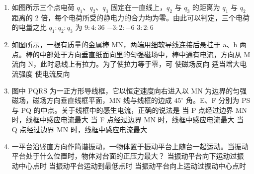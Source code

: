 \documentclass[\gkver]{gaokaozhenti}
\begin{document}
\begin{enumerate}
\item
如图所示三个点电荷 $q_{1}$、$q_{2}$、$q_{3}$ 固定在一直线上，$q_{2}$ 与 $q_{3}$ 的距离为 $q_{1}$ 与 $q_{2}$ 距离的 2 倍，每个电荷所受的静电力的合力均为零。由此可以判定，三个电荷的电量之比 $q_{1}:q_{2}:q_{3}$ 为
\onepicture[w=3.91cm]{}
{$9:4:36$}
{$-3:2:-6$}
{$3:2:6$}

\item
如图所示，一根有质量的金属棒 MN，两端用细软导线连接后悬挂于 a、b 两点。棒的中部处于方向垂直纸面向里的匀强磁场中，棒中通有电流，方向从 M 流向 N，此时悬线上有拉力。为了使拉力等于零，可
\onepicture[w=3.78cm]{}
{使磁场反向}
{适当增大电流强度}
{使电流反向}

\item
图中 PQRS 为一正方形导线框，它以恒定速度向右进入以 MN 为边界的匀强磁场，磁场方向垂直线框平面，MN 线与线框的边成 $45^{\circ}$ 角。E、F 分别为 PS 与 PQ 的中点。关于线框中的感生电流，正确的说法是
\onepicture[w=5.89cm]{}
{当 P 点经过边界 MN 时，线框中感应电流最大}
{当 F 点经过边界 MN 时，线框中感应电流最大}
{当 Q 点经过边界 MN 时，线框中感应电流最大}

\item
一平台沿竖直方向作简谐振动，一物体置于振动平台上随台一起运动。当振动平台处于什么位置时，物体对台面的正压力最大？
{当振动平台向下运动过振动中心点时}
{当振动平台运动到最低点时}
{当振动平台向上运动过振动中心点时}


\end{enumerate}
\end{document}
